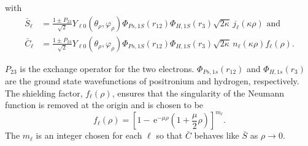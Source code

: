 \documentclass[preprint,showpacs,preprintnumbers,amsmath,amssymb]{revtex4}
\newcommand{\ee} {\,\text{e}}
\begin{document}
with
\begin{subequations}
\label{eq:SCBarPhiDef}
\begin{align}
\bar{S}_\ell &= \frac{1\pm P_{23}}{\sqrt{2}}Y_{\ell 0}(\theta_\rho,\varphi_\rho)\Phi_{Ps,1S}\left(r_{12}\right) \Phi_{H,1S}\left(r_3\right) \sqrt{2\kappa} \,j_\ell\left(\kappa\rho\right) \text{ and} \label{eq:SBar} \\
\bar{C}_\ell &= \frac{1\pm P_{23}}{\sqrt{2}}Y_{\ell 0}(\theta_\rho,\varphi_\rho)\Phi_{Ps,1S}\left(r_{12}\right) \Phi_{H,1S}\left(r_3\right) \sqrt{2\kappa} \,n_\ell\left(\kappa\rho\right) f_\ell(\rho). \label{eq:CBar}
\end{align}
\end{subequations}

$P_{23}$ is the exchange operator for the two electrons. $\Phi_{Ps,1s}\left(r_{12}\right)$ and $\Phi_{H,1s}\left(r_3\right)$ are the ground state wavefunctions of positronium and hydrogen, respectively. The shielding factor, $f_\ell(\rho)$, ensures that the singularity of the Neumann function is removed at the origin and is chosen to be
\begin{equation}
f_\ell(\rho) = \left[1 - \ee^{-\mu \rho} \left(1+\frac{\mu}{2}\rho\right)\right]^{m_\ell}.
\label{eq:PartialWaveShielding}
\end{equation}
The $m_\ell$ is an integer chosen for each $\ell$ so that $\bar{C}$ behaves like $\bar{S}$ as $\rho \rightarrow 0$.
\end{document}
